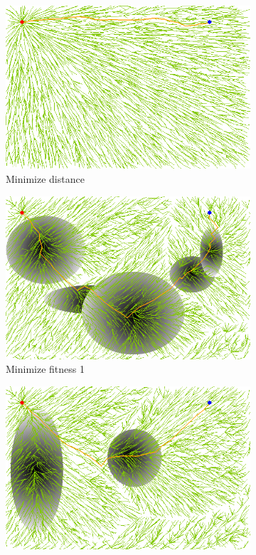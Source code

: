 \documentclass[conference]{IEEEtran}
\begin{document}
\begin{figure}
	\centering
	\begin{subfigure}[b]{0.31\linewidth}
		\centering
		\includegraphics[width=\textwidth]{fig/sim6-3obj/MORRTstar02-0.png}
		\caption{Minimize distance}
		\label{fig:sim:many:distance}
	\end{subfigure}
	\begin{subfigure}[b]{0.31\linewidth}
		\centering
		\includegraphics[width=\textwidth]{fig/sim6-3obj/MORRTstar02-1.png}
		\caption{Minimize fitness 1}
		\label{fig:sim:many:fitness1}
	\end{subfigure}
	\begin{subfigure}[b]{0.31\linewidth}
		\centering
		\includegraphics[width=\textwidth]{fig/sim6-3obj/MORRTstar02-2.png}

\end{subfigure}
\end{figure}
\end{document}
